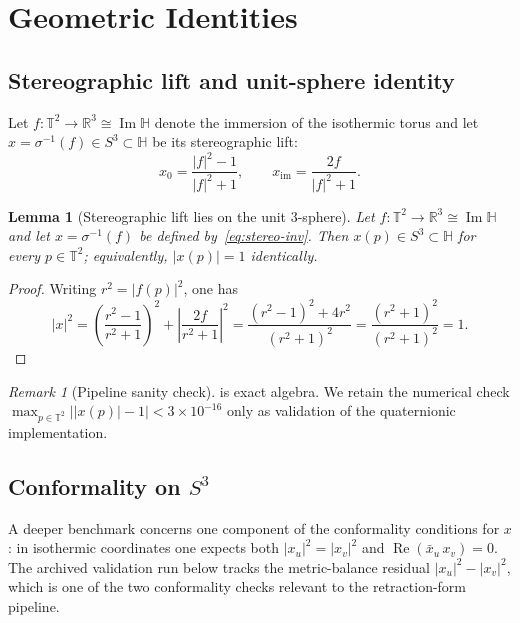 \documentclass[11pt,a4paper]{article}
\theoremstyle{plain}
\newtheorem{lemma}[theorem]{Lemma}
\theoremstyle{definition}
\theoremstyle{remark}
\newtheorem{remark}[theorem]{Remark}
\DeclareMathOperator{\Real}{Re}
\DeclareMathOperator{\Imag}{Im}
\newcommand{\RR}{\mathbb{R}}
\newcommand{\HH}{\mathbb{H}}            %
\newcommand{\T}{\mathbb{T}}             %
\newcommand{\abs}[1]{\lvert #1 \rvert}
\begin{document}
\section{Geometric Identities}\label{sec:analytical}

\subsection{Stereographic lift and unit-sphere identity}
\label{sec:unit-circle}
Let $f \colon \T^2 \to \RR^3 \cong \Imag\HH$ denote the immersion
of the isothermic torus and let
$x = \sigma^{-1}(f) \in S^3 \subset \HH$ be its stereographic lift:
\begin{equation}
  x_0 = \frac{\abs{f}^2 - 1}{\abs{f}^2 + 1}, \qquad
  x_{\mathrm{im}} = \frac{2f}{\abs{f}^2 + 1}.
  \label{eq:stereo-inv}
\end{equation}

\begin{lemma}[Stereographic lift lies on the unit $3$-sphere]
\label{lem:unit-x}
Let $f \colon \T^2 \to \RR^3 \cong \Imag\HH$ and let
$x = \sigma^{-1}(f)$ be defined by~\eqref{eq:stereo-inv}.  Then
$x(p) \in S^3 \subset \HH$ for every $p \in \T^2$; equivalently,
$\abs{x(p)} = 1$ identically.
\end{lemma}

\begin{proof}
Writing $r^2 = \abs{f(p)}^2$, one has
\[
  \abs{x}^2
  = \left(\frac{r^2-1}{r^2+1}\right)^2
    + \left\lvert\frac{2f}{r^2+1}\right\rvert^2
  = \frac{(r^2-1)^2+4r^2}{(r^2+1)^2}
  = \frac{(r^2+1)^2}{(r^2+1)^2}
  = 1.
\]
\end{proof}

\begin{remark}[Pipeline sanity check]
\label{obs:unit-x}
   is exact algebra.  We retain the numerical check
  $\max_{p \in \T^2} \bigl|\abs{x(p)} - 1\bigr|
  < 3 \times 10^{-16}$ only as validation of the quaternionic
  implementation.
\end{remark}

\subsection{Conformality on \texorpdfstring{$S^3$}{S³}}\label{sec:conformality}
A deeper benchmark concerns one component of the conformality conditions
for $x$: in isothermic coordinates one expects both
$\abs{x_u}^2 = \abs{x_v}^2$ and $\Real(\bar{x}_u\,x_v) = 0$.
The archived validation run below tracks the metric-balance residual
$\abs{x_u}^2 - \abs{x_v}^2$, which is one of the two conformality checks
relevant to the retraction-form pipeline.
\end{document}
